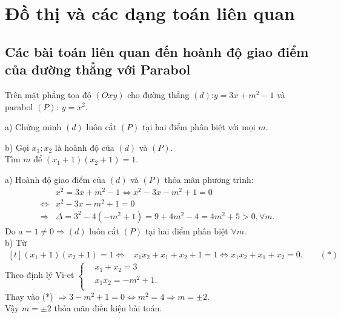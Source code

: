 
\chapter{Đồ thị và các dạng toán liên quan }

\section[Hoành độ giao điểm của đường thẳng với Parabol]{Các bài toán liên quan đến hoành độ giao điểm của đường thẳng với Parabol}


\begin{vd}
	Trên mặt phẳng tọa độ $\left( Oxy \right)$ cho đường thẳng $\left( d \right)$:$y=3x+{{m}^{2}}-1$ và parabol $(P)\colon \ y=x^2$.
	
	a) Chứng minh $\left( d \right)$ luôn cắt $\left( P \right)$ tại hai điểm phân biệt với mọi $m$.
	
	b) Gọi $x_1; x_2$ là hoành độ của $\left( d \right)$ và $\left( P \right)$.\\
	Tìm $m$ để $\left( x_1+1 \right)\left( x_2+1 \right)=1$.
	\loigiai
	{
		a) Hoành độ giao điểm của $\left( d \right)$ và $\left( P \right)$ thỏa mãn phương trình:
		\[\begin{aligned}
			&x^2=3x+{{m}^{2}}-1\Leftrightarrow x^2-3x-{{m}^{2}}+1=0\\
			\Leftrightarrow& x^2-3x-{{m}^{2}}+1=0\\
			\Rightarrow& \Delta ={{3}^{2}}-4\left( -{{m}^{2}}+1 \right)=9+4{{m}^{2}}-4=4{{m}^{2}}+5>0, \forall m.
		\end{aligned}
		\]
		Do $a=1\ne 0\Rightarrow \left( d \right)$ luôn cắt $\left( P \right)$ tại hai điểm phân biệt $\forall m$.
		\\
		b) Từ $\begin{aligned}[t]%
			\left( x_1+1 \right)\left( x_2+1 \right)=1
			\Leftrightarrow & x_1x_2+x_1+x_2+1=1 
			\Leftrightarrow  x_1x_2+x_1+x_2=0.\qquad (*)
		\end{aligned}$
		\\
		Theo định lý Vi-et $\left\{ \begin{aligned}
			& x_1+x_2=3 \\ 
			& x_1x_2=-{{m}^{2}}+1. \\ 
		\end{aligned} \right.$\\
		Thay vào (*) $\Rightarrow 3-{{m}^{2}}+1=0\Leftrightarrow {{m}^{2}}=4\Rightarrow m=\pm 2$.\\ 
		Vậy $m=\pm 2$ thỏa mãn điều kiện bài toán.
		
	}
\end{vd}
